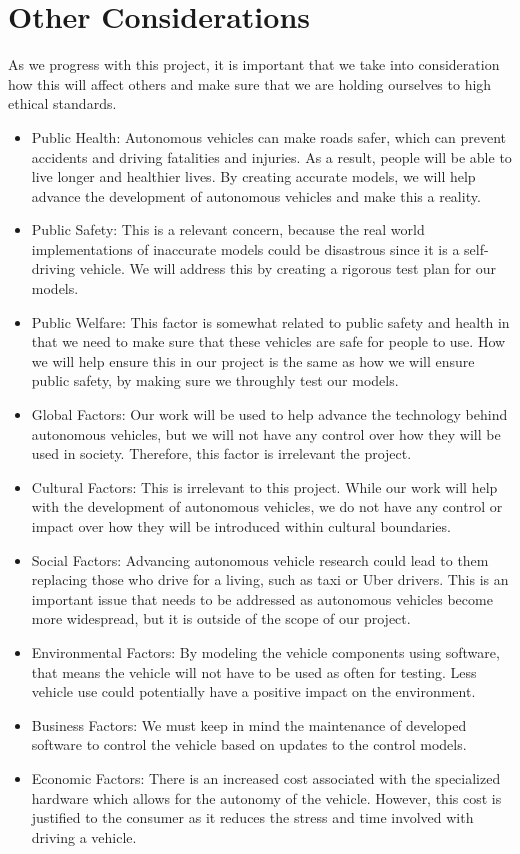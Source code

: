 \documentclass[12pt]{article} %
\begin{document}
\section{Other Considerations}
As we progress with this project, it is important that we take into consideration how this will affect others and make sure that we are holding ourselves to high ethical standards. 
\begin{itemize}
    \item Public Health: Autonomous vehicles can make roads safer, which can prevent accidents and driving fatalities and injuries. As a result, people will be able to live longer and healthier lives. By creating accurate models, we will help advance the development of autonomous vehicles and make this a reality. 
    \item Public Safety: This is a relevant concern, because the real world implementations of inaccurate models could be disastrous since it is a self-driving vehicle. We will address this by creating a rigorous test plan for our models. 
    \item Public Welfare: This factor is somewhat related to public safety and health in that we need to make sure that these vehicles are safe for people to use. How we will help ensure this in our project is the same as how we will ensure public safety, by making sure we throughly test our models. 
    \item Global Factors: Our work will be used to help advance the technology behind autonomous vehicles, but we will not have any control over how they will be used in society. Therefore, this factor is irrelevant the project. 
    \item Cultural Factors: This is irrelevant to this project. While our work will help with the development of autonomous vehicles, we do not have any control or impact over how they will be introduced within cultural boundaries.
    \item Social Factors: Advancing autonomous vehicle research could lead to them replacing those who drive for a living, such as taxi or Uber drivers. This is an important issue that needs to be addressed as autonomous vehicles become more widespread, but it is outside of the scope of our project. 
    \item Environmental Factors: By modeling the vehicle components using software, that means the vehicle will not have to be used as often for testing. Less vehicle use could potentially have a positive impact on the environment. 
    \item Business Factors: We must keep in mind the maintenance of developed software to control the vehicle based on updates to the control models. 
    \item Economic Factors: There is an increased cost associated with the specialized hardware which allows for the autonomy of the vehicle. However, this cost is justified to the consumer as it reduces the stress and time involved with driving a vehicle. 
\end{itemize}

\pagebreak


\end{document}
